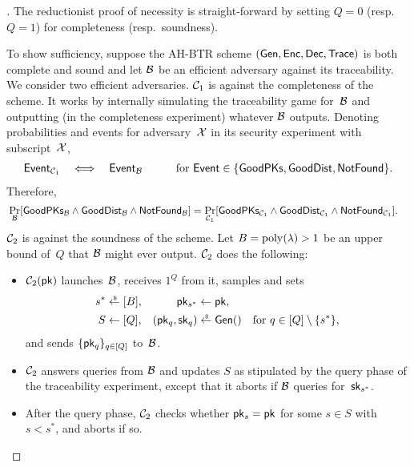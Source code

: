 \begin{proof}[]
The reductionist proof of necessity is straight-forward by setting ${Q=0}$ (resp.~${Q=1}$) for completeness (resp.~soundness).

To show sufficiency, suppose the AH-BTR scheme $(\Gen,\Enc,\Dec,\Trace)$ is both complete and sound and let ${\mathcal{B}}$ be an efficient adversary against its traceability.
We consider two efficient adversaries.
${\mathcal{C}}_1$ is against the completeness of the scheme.
It works by internally simulating the traceability game for~${\mathcal{B}}$ and outputting (in the completeness experiment) whatever ${\mathcal{B}}$ outputs.
Denoting probabilities and events for adversary~${\mathcal{X}}$ in its security experiment with subscript~${\mathcal{X}}$,
\begin{align*}
\mathsf{Event}_{\scriptC_1}
\quad\Longleftrightarrow\quad
\mathsf{Event}_\scriptB
\quad\qquad
\textup{for }\mathsf{Event}\in{\{\GoodPKs,\GoodDist,\NotFound\}}.
\end{align*}
Therefore,
\begin{align*}
&\Pr_\scriptB[\GoodPKs_\scriptB\wedge\GoodDist_\scriptB\wedge\NotFound_\scriptB]
\WideNarrow{}{\\&\qquad{}}=
\Pr_{\scriptC_1}
[\GoodPKs_{\scriptC_1}\wedge\GoodDist_{\scriptC_1}\wedge\NotFound_{\scriptC_1}].
\end{align*}
${\mathcal{C}}_2$ is against the soundness of the scheme.
Let ${B=\operatorname{poly}(\lambda)>1}$ be an upper bound of~$Q$ that ${\mathcal{B}}$ might ever output.
${\mathcal{C}}_2$ does the following:
\begin{itemize}
\item $\scriptC_2(\pk)$ launches~${\mathcal{B}}$, receives $1^Q$ from it,
samples and sets
\begin{align*}
s^\ast&{}\draws[B],&
\pk_{s^\ast}&{}\gets\pk,\\
S&{}\gets[Q],&
(\pk_q,\sk_q)&{}\draws\Gen()\quad\textup{for }q\in{[Q]\setminus{\{s^\ast\}}},
\end{align*}
and sends $\{\pk_q\}_{q\in[Q]}$ to~${\mathcal{B}}$.
\item ${\mathcal{C}}_2$ answers queries from ${\mathcal{B}}$ and updates $S$ as stipulated by the query phase of the traceability experiment, except that it aborts if ${\mathcal{B}}$ queries for~$\sk_{s^\ast}$.
\item After the query phase,
${\mathcal{C}}_2$ checks whether ${\pk_s=\pk}$ for some ${s\in S}$ with ${s<s^\ast}$,
and aborts if so.

\end{itemize}
\end{proof}
